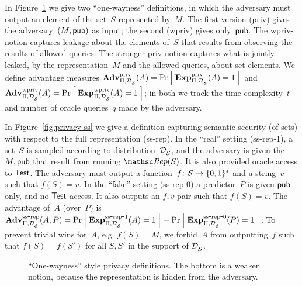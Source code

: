 In Figure~\ref{fig:privacy-ow} we give two ``one-wayness''
definitions, in which the adversary must output an element of the
set~$S$ represented by~$M$.  The first version (priv) gives the
adversary~$(M,{\sf pub})$ as input; the second (wpriv) gives
only~${\sf pub}$.  The wpriv-notion captures leakage about the elements
of~$S$ that results from observing the results of allowed queries.
The stronger priv-notion captures what is jointly leaked, by the
representation~$M$ and the allowed queries, about set elements.  We
define advantage measures $\mathrm{\mathbf{Adv}}^{\mathrm{priv}}_{\Pi,\mathcal{D}_{{\cal S}}^{}}(A) =
\Pr\left[\: \mathrm{\mathbf{Exp}}^{\mathrm{priv}}_{\Pi,\mathcal{D}_{{\cal S}}^{}}(A)=1 \:\right]$ and $\mathrm{\mathbf{Adv}}^{\mathrm{wpriv}}_{\Pi,\mathcal{D}_{{\cal S}}^{}}(A) =
\Pr\left[\: \mathrm{\mathbf{Exp}}^{\mathrm{wpriv}}_{\Pi,\mathcal{D}_{{\cal S}}^{}}(A)=1 \:\right]$; in both we track the
time-complexity~$t$ and number of oracle queries~$q$ made by the adversary.

In Figure~\ref{fig:privacy-ss} we give a definition capturing semantic-security (of sets)
with respect to the full representation (ss-rep).  In the ``real''
setting (ss-rep-1), a set~$S$ is sampled according to distribution~$\mathcal{D}_{{\cal S}}^{}$,
and the adversary is given the~$M,{\sf pub}$ that result from running
$\Rep(S)$.  It is also provided oracle access to $\mathsf{Test}$.
The adversary must output a function~$f\colon{\cal S} \to \{0,1\}^*$ and a
string~$v$ such that $f(S)=v$.  In the ``fake'' setting (ss-rep-0) a
predictor~$P$ is given ${\sf pub}$ only, and no $\mathsf{Test}$ access.  It
also outputs an $f,v$ pair such that $f(S)=v$.  The advantage of~$A$ (over~$P$)
is $\mathrm{\mathbf{Adv}}^{\mathrm{ss\mbox{-}rep}}_{\Pi,\mathcal{D}_{{\cal S}}^{}}(A,P) =
\Pr\left[\: \mathrm{\mathbf{Exp}}^{\mathrm{ss\mbox{-}rep\mbox{-}1}}_{\Pi,\mathcal{D}_{{\cal S}}^{}}(A)=1 \:\right] -
\Pr\left[\: \mathrm{\mathbf{Exp}}^{\mathrm{ss\mbox{-}rep\mbox{-}0}}_{\Pi,\mathcal{D}_{{\cal S}}^{}}(P)=1 \:\right]$.  To prevent trivial wins
for~$A$, e.g. $f(S)=M$, we forbid~$A$ from outputting~$f$
such that $f(S)=f(S')$ for all $S,S'$ in the support of $\mathcal{D}_{{\cal S}}^{}$.


\begin{figure}[htbp]
\centering
{}
\caption{``One-wayness'' style privacy
  definitions. The bottom is a weaker notion, because the representation
  is hidden from the adversary.} 
\label{fig:privacy-ow}
\end{figure}

